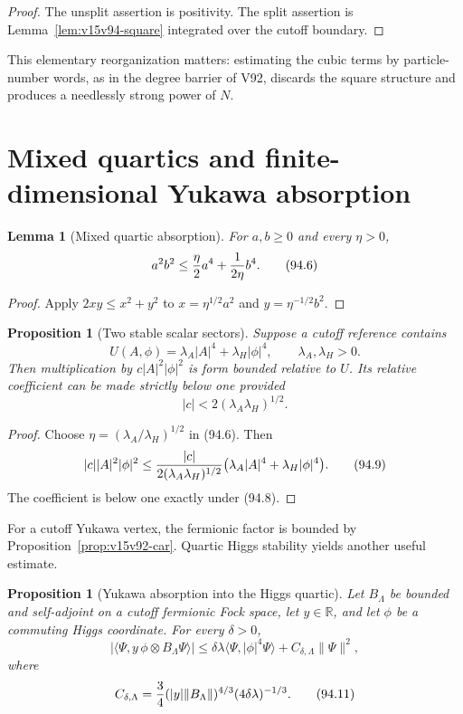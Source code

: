 \documentclass[11pt]{article}
\newtheorem{proposition}[theorem]{Proposition}
\newtheorem{lemma}[theorem]{Lemma}
\theoremstyle{remark}
\begin{document}
\begin{proof}
The unsplit assertion is positivity.  The split assertion is
Lemma~\ref{lem:v15v94-square} integrated over the cutoff boundary.
\end{proof}

This elementary reorganization matters: estimating the cubic terms
by particle-number words, as in the degree barrier of V92, discards
the square structure and produces a needlessly strong power of
\(N\).

\section{Mixed quartics and finite-dimensional Yukawa absorption}

\begin{lemma}[Mixed quartic absorption]
\label{lem:v15v94-mixed}
For \(a,b\geq0\) and every \(\eta>0\),
\[
 a^2b^2\leq{\eta\over2}a^4+{1\over2\eta}b^4.          \tag{94.6}
\]
\end{lemma}

\begin{proof}
Apply \(2xy\leq x^2+y^2\) to
\(x=\eta^{1/2}a^2\) and \(y=\eta^{-1/2}b^2\).
\end{proof}

\begin{proposition}[Two stable scalar sectors]
\label{prop:v15v94-two-sector}
Suppose a cutoff reference contains
\[
 U(A,\phi)=\lambda_A|A|^4+\lambda_H|\phi|^4,
 \qquad \lambda_A,\lambda_H>0.                         \tag{94.7}
\]
Then multiplication by \(c|A|^2|\phi|^2\) is form bounded relative
to \(U\).  Its relative coefficient can be made strictly below one
provided
\[
 |c|<2(\lambda_A\lambda_H)^{1/2}.                     \tag{94.8}
\]
\end{proposition}

\begin{proof}
Choose \(\eta=(\lambda_A/\lambda_H)^{1/2}\) in (94.6).  Then
\[
 |c||A|^2|\phi|^2
 \leq {|c|\over2(\lambda_A\lambda_H)^{1/2}}
       \bigl(\lambda_A|A|^4+\lambda_H|\phi|^4\bigr).   \tag{94.9}
\]
The coefficient is below one exactly under (94.8).
\end{proof}

For a cutoff Yukawa vertex, the fermionic factor is bounded by
Proposition~\ref{prop:v15v92-car}.  Quartic Higgs stability yields
another useful estimate.

\begin{proposition}[Yukawa absorption into the Higgs quartic]
\label{prop:v15v94-yukawa}
Let \(B_\Lambda\) be bounded and self-adjoint on a cutoff fermionic
Fock space, let \(y\in\mathbb R\), and let \(\phi\) be a commuting
Higgs coordinate.  For every \(\delta>0\),
\[
 \bigl|\langle\Psi,y\,\phi\otimes B_\Lambda\Psi\rangle\bigr|
 \leq\delta\lambda\langle\Psi,|\phi|^4\Psi\rangle
 +C_{\delta,\Lambda}\|\Psi\|^2,                       \tag{94.10}
\]
where
\[
 C_{\delta,\Lambda}
 ={3\over4}
 (|y|\|B_\Lambda\|)^{4/3}(4\delta\lambda)^{-1/3}.      \tag{94.11}
\]
\end{proposition}
\end{document}

